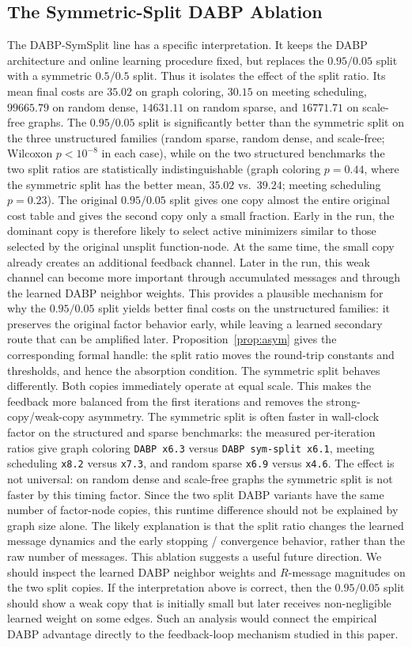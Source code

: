 \subsection{The Symmetric-Split DABP Ablation}
The DABP-SymSplit line has a specific interpretation.  It keeps the DABP
architecture and online learning procedure fixed, but replaces the $0.95/0.05$
split with a symmetric $0.5/0.5$ split.  Thus it isolates the effect of the split
ratio.  Its mean final costs are $35.02$ on graph coloring, $30.15$ on
meeting scheduling, $99665.79$ on random dense, $14631.11$ on random
sparse, and $16771.71$ on scale-free graphs.
The $0.95/0.05$ split is significantly better than the symmetric split on the
three unstructured families (random sparse, random dense, and scale-free;
Wilcoxon $p < 10^{-8}$ in each case), while on the two structured benchmarks
the two split ratios are statistically indistinguishable (graph coloring
$p = 0.44$, where the symmetric split has the better mean, $35.02$ vs.\
$39.24$; meeting scheduling $p = 0.23$).
The original $0.95/0.05$ split gives one copy almost the entire original cost
table and gives the second copy only a small fraction.  Early in the run, the
dominant copy is therefore likely to select active minimizers similar to those
selected by the original unsplit function-node.  At the same time, the small
copy already creates an additional feedback channel.  Later in the run, this
weak channel can become more important through accumulated messages and
through the learned DABP neighbor weights.  This provides a plausible mechanism
for why the $0.95/0.05$ split yields better final costs on the unstructured
families: it preserves the original factor behavior early, while leaving a
learned secondary route that can be amplified later.  Proposition~\ref{prop:asym}
gives the corresponding formal handle: the split ratio moves the round-trip
constants and thresholds, and hence the absorption condition.
The symmetric split behaves differently.  Both copies immediately operate at
equal scale.  This makes the feedback more balanced from the first iterations
and removes the strong-copy/weak-copy asymmetry.  The symmetric split is
often faster in wall-clock factor on the structured and sparse benchmarks: the
measured per-iteration ratios give graph coloring \texttt{DABP x6.3} versus
\texttt{DABP sym-split x6.1}, meeting scheduling \texttt{x8.2} versus
\texttt{x7.3}, and random sparse \texttt{x6.9} versus \texttt{x4.6}.  The
effect is not universal: on random dense and scale-free graphs the symmetric
split is not faster by this timing factor.  Since the two split DABP variants
have the same number of factor-node copies, this runtime difference should not
be explained by graph size alone.  The likely explanation is that the split
ratio changes the learned message dynamics and the early stopping / convergence
behavior, rather than the raw number of messages.
This ablation suggests a useful future direction.  We should inspect the learned
DABP neighbor weights and $R$-message magnitudes on the two split copies.  If
the interpretation above is correct, then the $0.95/0.05$ split should show a
weak copy that is initially small but later receives non-negligible learned
weight on some edges.  Such an analysis would connect the empirical DABP
advantage directly to the feedback-loop mechanism studied in this paper.
